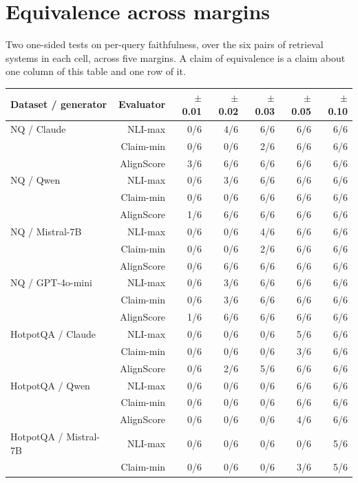 \documentclass[11pt]{article}
\begin{document}
\section{Equivalence across margins}
\label{app:tost}

Two one-sided tests on per-query faithfulness, over the six pairs of retrieval systems in each cell, across five margins. A claim of equivalence is a claim about one column of this table and one row of it.

\begin{table}[t]
\centering
\small
\begin{tabular}{lrrrrrr}
\toprule
\textbf{Dataset / generator} & \textbf{Evaluator} & \textbf{$\pm$0.01} & \textbf{$\pm$0.02} & \textbf{$\pm$0.03} & \textbf{$\pm$0.05} & \textbf{$\pm$0.10} \\
\midrule
NQ / Claude & NLI-max & 0/6 & 4/6 & 6/6 & 6/6 & 6/6 \\
 & Claim-min & 0/6 & 0/6 & 2/6 & 6/6 & 6/6 \\
 & AlignScore & 3/6 & 6/6 & 6/6 & 6/6 & 6/6 \\
NQ / Qwen & NLI-max & 0/6 & 3/6 & 6/6 & 6/6 & 6/6 \\
 & Claim-min & 0/6 & 0/6 & 6/6 & 6/6 & 6/6 \\
 & AlignScore & 1/6 & 6/6 & 6/6 & 6/6 & 6/6 \\
NQ / Mistral-7B & NLI-max & 0/6 & 0/6 & 4/6 & 6/6 & 6/6 \\
 & Claim-min & 0/6 & 0/6 & 2/6 & 6/6 & 6/6 \\
 & AlignScore & 0/6 & 6/6 & 6/6 & 6/6 & 6/6 \\
NQ / GPT-4o-mini & NLI-max & 0/6 & 3/6 & 6/6 & 6/6 & 6/6 \\
 & Claim-min & 0/6 & 3/6 & 6/6 & 6/6 & 6/6 \\
 & AlignScore & 1/6 & 6/6 & 6/6 & 6/6 & 6/6 \\
\midrule
HotpotQA / Claude & NLI-max & 0/6 & 0/6 & 0/6 & 5/6 & 6/6 \\
 & Claim-min & 0/6 & 0/6 & 0/6 & 3/6 & 6/6 \\
 & AlignScore & 0/6 & 2/6 & 5/6 & 6/6 & 6/6 \\
HotpotQA / Qwen & NLI-max & 0/6 & 0/6 & 0/6 & 6/6 & 6/6 \\
 & Claim-min & 0/6 & 0/6 & 0/6 & 6/6 & 6/6 \\
 & AlignScore & 0/6 & 0/6 & 0/6 & 4/6 & 6/6 \\
HotpotQA / Mistral-7B & NLI-max & 0/6 & 0/6 & 0/6 & 0/6 & 5/6 \\
 & Claim-min & 0/6 & 0/6 & 0/6 & 3/6 & 5/6 \\

\end{tabular}
\end{table}
\end{document}
